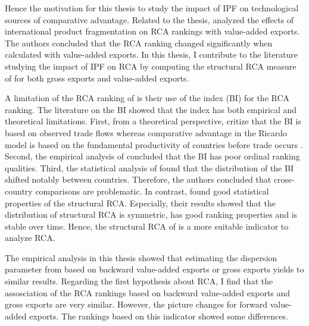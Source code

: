  \par %
Hence the motivation for this thesis to study the impact of IPF on technological sources of comparative advantage.
 Related to the thesis, \textcite{Koopman} analyzed the effects of international product fragmentation on RCA rankings with  value-added
exports. The authors concluded that the RCA ranking changed significantly when calculated with value-added exports.
In this thesis, I contribute to the literature studying the impact of IPF on RCA  by computing the structural RCA measure of  \textcite{costinot} for both gross exports and value-added exports.
\par %
A limitation of the RCA ranking of  \textcite{Koopman} is their use of the \textcite{Balassa} index (BI) for the RCA ranking.
The literature on the BI showed that the index has both empirical and theoretical limitations.
 First, from a theoretical perspective,\textcite{leromain2014,} critize that the BI is based on observed trade flows whereas comparative advantage in the Ricardo model is based on the fundamental productivity of countries before trade occurs \parencite{leromain2014}. 
  Second, the empirical analysis of \textcite{yeats} concluded that the BI has poor ordinal ranking qualities. Third, the statistical analysis of \textcite{hinloopen2001} found that the distribution of the BI shifted notably between countries.
   Therefore, the authors concluded that cross-country comparisons are problematic.%
In contrast,  \textcite{Leromain} found good statistical properties of the structural RCA.
 Especially, their results showed that the distribution of structural RCA is symmetric, has good ranking properties and is stable over time.
  Hence, the structural RCA of \textcite{costinot} is a more suitable indicator to analyze RCA.  \par
The empirical analysis in this thesis showed that estimating the dispersion parameter from \textcite{costinot} based on backward value-added exports or gross exports yields to similar results. 
Regarding the first hypothesis about RCA, I find that the assosciation of the RCA rankings based on backward value-added exports and gross exports are very similar. However, the picture changes for forward value-added exports. The rankings based on this indicator showed some differences. 
